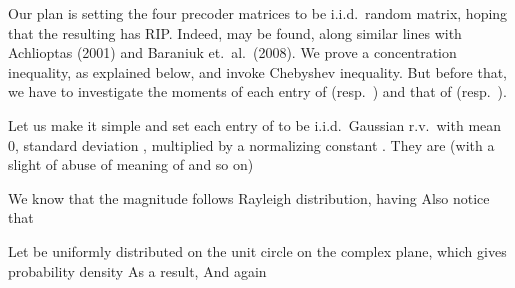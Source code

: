 \startsection [title={Confirming Restricted Isometry of Beamformer}]
\startsubsection [title={Design of Beamformer entries}]

Our plan is setting the four precoder matrices to be i.i.d.\ random matrix, hoping that the resulting  has RIP.
Indeed,  may be found, along similar lines with Achlioptas (2001) and Baraniuk et.\ al.\ (2008).
We prove a concentration inequality, as explained below, and invoke Chebyshev inequality.
But before that, we have to investigate the moments of each entry of  (resp.\ ) and that of  (resp.\ ).

Let us make it simple and set each entry of  to be i.i.d.\ Gaussian r.v.\ with mean 0, standard deviation , multiplied by a normalizing constant .
They are (with a slight of abuse of meaning of  and so on)

We know that the magnitude  follows Rayleigh distribution, having
Also notice that

Let  be uniformly distributed on the unit circle on the complex plane, which gives probability density
As a result,
And again

